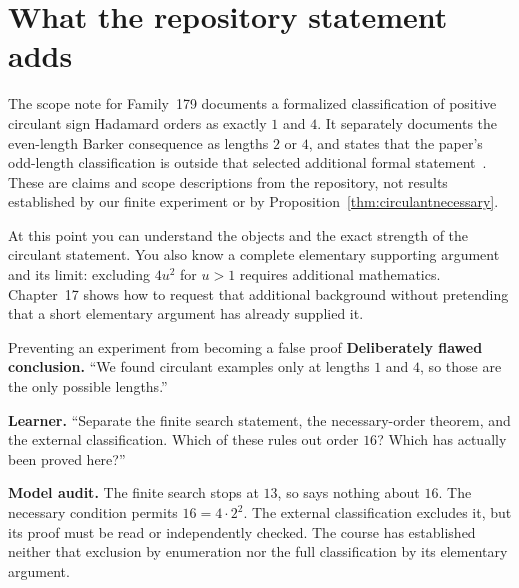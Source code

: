 \section{What the repository statement adds}
The scope note for Family~179 documents a formalized classification of positive circulant sign Hadamard orders as exactly $1$ and $4$. It separately documents the even-length Barker consequence as lengths $2$ or $4$, and states that the paper's odd-length classification is outside that selected additional formal statement~\cite{oai179}. These are claims and scope descriptions from the repository, not results established by our finite experiment or by Proposition~\ref{thm:circulantnecessary}.

At this point you can understand the objects and the exact strength of the circulant statement. You also know a complete elementary supporting argument and its limit: excluding $4u^2$ for $u>1$ requires additional mathematics. Chapter~17 shows how to request that additional background without pretending that a short elementary argument has already supplied it.

\begin{lab}{Preventing an experiment from becoming a false proof}
\noindent\textbf{Deliberately flawed conclusion.} ``We found circulant examples only at lengths $1$ and $4$, so those are the only possible lengths.''

\noindent\textbf{Learner.} ``Separate the finite search statement, the necessary-order theorem, and the external classification. Which of these rules out order $16$? Which has actually been proved here?''

\noindent\textbf{Model audit.} The finite search stops at $13$, so says nothing about $16$. The necessary condition permits $16=4\cdot2^2$. The external classification excludes it, but its proof must be read or independently checked. The course has established neither that exclusion by enumeration nor the full classification by its elementary argument.
\end{lab}
